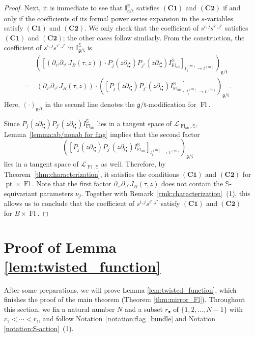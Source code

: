 \documentclass[a4paper,12pt]{amsart}
\numberwithin{equation}{section}
\theoremstyle{definition}
\newcommand{\I}{\mathbb{I}}
\newcommand{\bbS}{\mathbb{S}}
\newcommand{\cL}{\mathcal{L}}
\newcommand{\gt}{{\mathfrak{g}/\mathfrak{t}}}
\newcommand{\pt}{\operatorname{pt}}
\newcommand{\FlG}{\operatorname{Fl}}
\newcommand{\FlT}{\operatorname{Fl}_{\operatorname{ab}}}
\begin{document}
\begin{proof}
    Next, it is immediate to see that $\I^\bbS_\gt$ satisfies $\mathbf{(C1)}$ and $\mathbf{(C2)}$ if and only if the coefficients of its formal power series expansion in the $s$-variables satisfy $\mathbf{(C1)}$ and $\mathbf{(C2)}$.
    We only check that the coefficient of $s^{i,j}s^{i',j'}$ satisfies $\mathbf{(C1)}$ and $\mathbf{(C2)}$; the other cases follow similarly.
    From the construction, the coefficient of $s^{i,j}s^{i',j'}$ in $\I^\bbS_\gt$ is
    \begin{align*}
        & \left( \left[ \left( \partial_{\tau^i}\partial_{\tau^{i'}}J_B(\tau,z) \right) \cdot P_j(z\partial_{t_\bullet^\bullet}) P_{j'}(z\partial_{t_\bullet^\bullet}) I_{\FlT}^\bbS \right]_{t_i^{(m)}\to t^{(m)}} \right)_\gt  \\
        =&\ \left( \partial_{\tau^i}\partial_{\tau^{i'}}J_B(\tau,z) \right) \cdot \left( \left[ P_j(z\partial_{t_\bullet^\bullet}) P_{j'}(z\partial_{t_\bullet^\bullet}) I_{\FlT}^\bbS \right]_{t_i^{(m)}\to t^{(m)}} \right)_\gt.
    \end{align*}
    Here, $(\cdot)_\gt$ in the second line denotes the $\gt$-modification for $\FlG$.
    
    Since $P_j(z\partial_{t_\bullet^\bullet}) P_{j'}(z\partial_{t_\bullet^\bullet}) I_{\FlT}^\bbS$ lies in a tangent space of $\cL_{\FlT,\bbS}$, Lemma~\ref{lemma:ab/nonab for flag} implies that the second factor
    \[
    \left( \left[ P_j(z\partial_{t_\bullet^\bullet}) P_{j'}(z\partial_{t_\bullet^\bullet}) I_{\FlT}^\bbS \right]_{t_i^{(m)}\to t^{(m)}} \right)_\gt
    \]
    lies in a tangent space of $\cL_{\FlG,\bbS}$ as well. Therefore, by
    Theorem~\ref{thm:characterization}, it satisfies the conditions $\mathbf{(C1)}$ and $\mathbf{(C2)}$ for $\pt\times\FlG$.
    Note that the first factor $\partial_{\tau^i}\partial_{\tau^{i'}}J_B(\tau,z)$ does not contain the $\bbS$-equivariant parameters $\nu_j$. Together with Remark~\ref{rmk:characterization}~(1), this allows us to conclude that the coefficient of $s^{i,j}s^{i',j'}$ satisfy $\mathbf{(C1)}$ and $\mathbf{(C2)}$ for $B\times\FlG$.
\end{proof}




\section{Proof of Lemma \ref{lem:twisted_function}}\label{sec:proof_of_Lemma}
After some preparations, we will prove Lemma \ref{lem:twisted_function}, which finishes the proof of the main theorem (Theorem \ref{thm:mirror_Fl}).
Throughout this section, we fix a natural number $N$ and a subset $r_\bullet$ of $\{1,2,\dots,N-1\}$ with $r_1<\cdots<r_l$, and follow Notation~\ref{notation:flag_bundle} and Notation \ref{notation:S-action}~(1).
\end{document}
